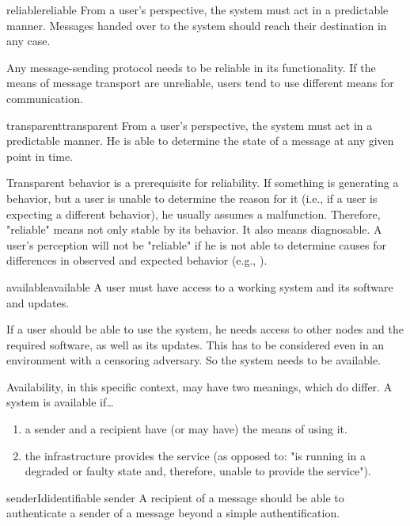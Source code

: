 \begin{requirement}{reliable}{reliable}
	From a user's perspective, the system must act in a predictable manner. Messages handed over to the system should reach their destination in any case.
\end{requirement}

Any message-sending protocol needs to be reliable in its functionality. If the means of message transport are unreliable, users tend to use different means for communication\cite{zhou2011examining}. 

\begin{requirement}{transparent}{transparent}
	From a user's perspective, the system must act in a predictable manner. He is able to determine the state of a message at any given point in time.
\end{requirement}

Transparent behavior is a prerequisite for reliability. If something is generating a  behavior, but a user is unable to determine the reason for it (i.e., if a user is expecting a different behavior), he usually assumes a malfunction. Therefore, "reliable" means not only stable by its behavior. It also means diagnosable. A user's perception will not be "reliable" if he is not able to determine causes for differences in observed and expected behavior (e.g., \cite{nicholson2003assessing}).

\begin{requirement}{available}{available}
	A user must have access to a working system and its software and updates.
\end{requirement}

If a user should be able to use the system, he needs access to other nodes and the required software, as well as its updates. This has to be considered even in an environment with a censoring adversary. So the system needs to be available.

Availability, in this specific context, may have two meanings, which do differ. A system is available if\ldots
\begin{enumerate}
	\item a sender and a recipient have (or may have) the means of using it.
	\item the infrastructure provides the service (as opposed to: "is running in a degraded or faulty state and, therefore, unable to provide the service").
\end{enumerate}

\begin{requirement}{senderId}{identifiable sender}
	A recipient of a message should be able to authenticate a sender of a message beyond a simple authentification.
\end{requirement}

